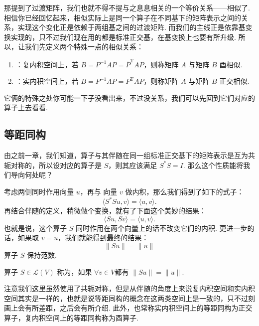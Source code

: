 那提到了过渡矩阵，我们也就不得不提与之息息相关的一个等价关系——相似了. 相信你已经回忆起来，相似实际上是同一个算子在不同基下的矩阵表示之间的关系，实现这个变化正是依赖于两组基之间的过渡矩阵. 而我们的主线正是依靠基变换实现的，只不过我们现在用的都是标准正交基，在基变换上也要有所升级. 所以，让我们先定义两个特殊一点的相似关系：

\begin{definition}
    \begin{enumerate}
        \item {}：复内积空间上，若 $ B = P^{-1}AP = \overline{P}^{\mathrm{T}}AP $，则称矩阵 $ A $ 与矩阵 $ B $ 酉相似.

        \item {}：实内积空间上，若 $ B = P^{-1}AP = {P}^{\mathrm{T}}AP $，则称矩阵 $ A $ 与矩阵 $ B $ 正交相似.
    \end{enumerate}
\end{definition}

它俩的特殊之处你可能一下子没看出来，不过没关系，我们可以先回到它们对应的算子上去看看.

\subsection{等距同构}

由之前一章，我们知道，算子与其伴随在同一组标准正交基下的矩阵表示是互为共轭对称的，所以设对应的算子是 $ S $，则其应该满足 $ S^*S = I $. 那么这个性质能将我们导向何处呢？

考虑两侧同时作用向量 $ u $，再与 向量 $ v $ 做内积，那么我们得到了如下的式子：
\[ \langle S^*Su, v \rangle = \langle u, v \rangle. \]
再结合伴随的定义，稍微做个变换，就有了下面这个美妙的结果：
\[ \langle Su, Sv \rangle = \langle u, v \rangle. \]
也就是说，这个算子 $ S $ 同时作用在两个向量上的话不改变它们的内积. 更进一步的话，如果取 $ v = u $，我们就能得到最终的结果：
\[ \lVert Su \rVert = \lVert u \rVert \]
算子 $ S $ 保持范数.

\begin{definition}[等距同构] 
    算子 $ S \in \mathcal{L}(V) $ 称为，如果 $ \forall v \in V $都有 $ \lVert Su \rVert = \lVert u \rVert $.
\end{definition}

注意我们这里虽然使用了共轭对称，但是从伴随的角度上来说复内积空间和实内积空间其实是一样的，也就是说等距同构的概念在这两类空间上是一致的，只不过刻画上会有所差距，之后会有所介绍. 此外，也常称实内积空间上的等距同构为正交算子，复内积空间上的等距同构称为酉算子.

